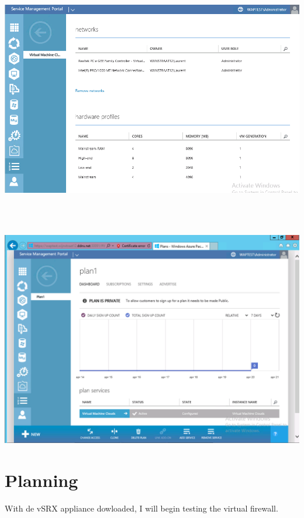 \documentclass[11pt, a4paper]{article}
\begin{document}
\noindent\begin{minipage}{\textwidth}
    \centering
    \includegraphics[width=\textwidth]{Plan_6.png}
\end{minipage}
$\;$ \\ \\
\noindent\begin{minipage}{\textwidth}
    \centering
    \includegraphics[width=\textwidth]{Plan_7.png}
\end{minipage}


\section*{Planning}

With de vSRX appliance dowloaded, I will begin testing the virtual firewall.
\end{document}
